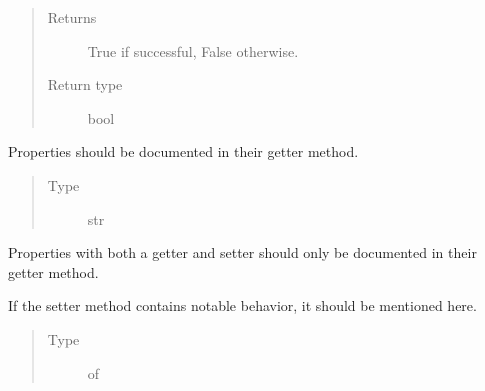 \documentclass[letterpaper,10pt,english]{sphinxmanual}
\begin{document}
\begin{description}
\begin{fulllineitems}
\begin{fulllineitems}
\begin{quote}
\begin{description}
\item[{Returns}] \leavevmode
True if successful, False otherwise.

\item[{Return type}] \leavevmode
bool

\end{description}\end{quote}

\end{fulllineitems}


\begin{fulllineitems}
\label{\detokenize{autogen:example_docstring.ExampleClass.readonly_property}}
Properties should be documented in their getter method.
\begin{quote}\begin{description}
\item[{Type}] \leavevmode
str

\end{description}\end{quote}

\end{fulllineitems}


\begin{fulllineitems}
\label{\detokenize{autogen:example_docstring.ExampleClass.readwrite_property}}
Properties with both a getter and setter
should only be documented in their getter method.

If the setter method contains notable behavior, it should be
mentioned here.
\begin{quote}\begin{description}
\item[{Type}] \leavevmode
{} of 

\end{description}\end{quote}


\end{fulllineitems}
\end{fulllineitems}
\end{description}
\end{document}
